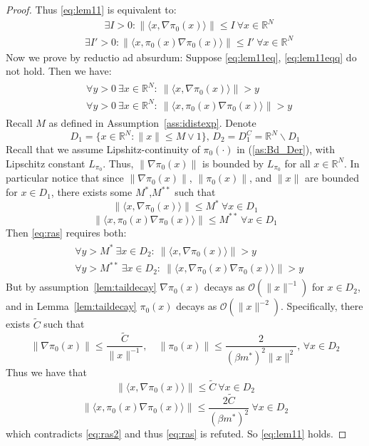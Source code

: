 \documentclass[journal,onecolumn]{IEEEtran}
\newcommand{\grad}{\nabla}
\newcommand{\reals}{\mathbb{R}}
\newcommand{\dimn}{N}
\newcommand{\idistr}{\ids_0}
\newcommand{\Dbound}{L_{\idistr}}
\newcommand{\ids}{\pi}
\newcommand{\tailbound}{M}
\newcommand{\idiffconst}{\tilde{C}}
\newcommand{\idiffc}{I}
\newcommand{\idiffcc}{I'}
\begin{document}
{\begin{proof}
 Thus \eqref{eq:lem11} is equivalent to:
\begin{align}
    \label{eq:lem11eq}
    &\exists \idiffc >0 : \|\langle x, \grad\idistr(x) \rangle\| \leq \idiffc \ \forall x \in \reals^{\dimn}
\end{align}
\begin{align}
\label{eq:lem11eqq}
    &\exists \idiffcc >0 : \|\langle x, \idistr(x)\grad\idistr(x) \rangle\| \leq \idiffcc \ \forall x \in \reals^{\dimn}
\end{align}
Now we prove by reductio ad absurdum: Suppose \eqref{eq:lem11eq}, \eqref{eq:lem11eqq} do not hold. Then we have:
\begin{align}
\begin{split}
\label{eq:ras}
    &\forall y >0 \ \exists x \in \reals^{\dimn}  : \ \|\langle x, \grad\idistr(x) \rangle\| > y \\
    &\forall y >0 \ \exists x \in \reals^{\dimn}  : \ \|\langle x, \idistr(x)\grad\idistr(x) \rangle\| > y 
\end{split}
\end{align}
Recall $\tailbound$ as defined in Assumption~\ref{ass:idistexp}. Denote \[D_1 = \{x\in \reals^{\dimn} : \|x\| \leq \tailbound \vee 1\}, \,D_2 = D_1^C = \reals^{\dimn}\backslash D_1\] Recall that we assume Lipshitz-continuity of $\idistr(\cdot)$ in (\ref{as:Bd_Der}), with Lipschitz constant $\Dbound$. Thus, $\|\grad\idistr(x)\|$ is bounded by $\Dbound$ for all $x\in\reals^{\dimn}$. In particular notice that since $\|\grad\idistr(x)\|$, $\|\idistr(x)\|$, and $\|x\|$ are bounded for $x \in D_1$, there exists some $M^*$,$M^{**}$ such that \[\|\langle x, \grad\idistr(x) \rangle\| \leq M^* \ \forall x \in D_1\]
\[\|\langle x, \idistr(x)\grad\idistr(x) \rangle\| \leq M^{**} \ \forall x \in D_1\]
Then \eqref{eq:ras} requires both:
\begin{align}
\begin{split}
\label{eq:ras2}
    &\forall y > M^* \ \exists x \in D_2 : \ \|\langle x, \grad \idistr(x) \rangle\| > y \\
    &\forall y > M^{**} \ \exists x \in D_2 : \ \|\langle x, \grad \idistr(x)\grad\idistr(x) \rangle\| > y 
\end{split}
\end{align} 
But by assumption~\ref{lem:taildecay} $\grad \idistr(x)$ decays as $\mathcal{O}(\|x\|^{-1})$ for $x \in D_2$, and in Lemma~\ref{lem:taildecay} $\idistr(x)$ decays as $\mathcal{O}(\|x\|^{-2})$. Specifically, there exists $\idiffconst$ such that \[\|\grad\idistr(x)\| \leq \frac{\idiffconst}{\|x\|^{-1}}, \quad \|\idistr(x)\| \leq \frac{2}{(\beta m^*)^2\|x\|^2},\, \forall x \in D_2\] Thus we have that \[\|\langle x, \grad \idistr(x) \rangle\| \leq \idiffconst \ \forall x \in D_2\]
\[\|\langle x, \idistr(x)\grad \idistr(x) \rangle\| \leq \frac{2\idiffconst}{(\beta m^*)^2} \ \forall x \in D_2\]which contradicts \eqref{eq:ras2} and thus \eqref{eq:ras} is refuted. So \eqref{eq:lem11} holds.
\end{proof}

}
\end{document}
